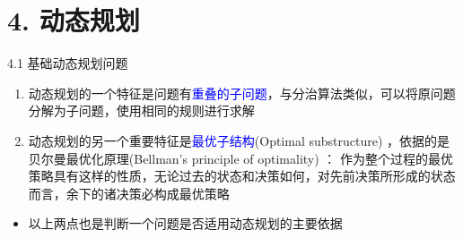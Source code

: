 


\frame{\titlepage}
\section{4. 动态规划}
\begin{frame}{4.1 基础动态规划问题}
    \begin{enumerate}
        \item 动态规划的一个特征是问题有\textcolor{blue}{重叠的子问题}，与分治算法类似，可以将原问题分解为子问题，使用相同的规则进行求解
        \vfill
        \item 动态规划的另一个重要特征是\textcolor{blue}{最优子结构}(Optimal substructure) ，依据的是贝尔曼最优化原理(Bellman's principle of optimality) ： 作为整个过程的最优策略具有这样的性质，无论过去的状态和决策如何，对先前决策所形成的状态而言，余下的诸决策必构成最优策略
    \end{enumerate}
    \vfill
    \begin{itemize}
        \item 以上两点也是判断一个问题是否适用动态规划的主要依据
    \end{itemize}
\end{frame}
